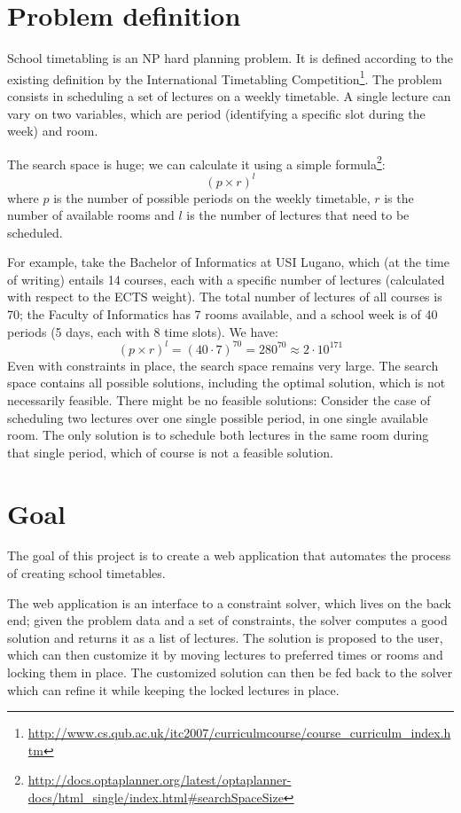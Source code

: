 \documentclass[12pt, a4paper, english]{report}
\begin{document}
\section{Problem definition}
School timetabling is an NP hard planning problem. It is defined according to the existing definition by the {International Timetabling Competition}\footnote{\url{http://www.cs.qub.ac.uk/itc2007/curriculmcourse/course\_curriculm\_index.htm}}. The problem consists in scheduling a set of lectures on a weekly timetable. A single lecture can vary on two variables, which are period (identifying a specific slot during the week) and room.\par
The search space is huge; we can calculate it using a simple formula\footnote{\url{http://docs.optaplanner.org/latest/optaplanner-docs/html\_single/index.html\#searchSpaceSize}}: %
\[
	(p \times r)^l
\]
where \(p\) is the number of possible periods on the weekly timetable, \(r\) is the number of available rooms and \(l\) is the number of lectures that need to be scheduled.\par
For example, take the Bachelor of Informatics at USI Lugano, which (at the time of writing) entails 14 courses, each with a specific number of lectures (calculated with respect to the ECTS weight). The total number of lectures of all courses is 70; the Faculty of Informatics has 7 rooms available, and a school week is of 40 periods (5 days, each with 8 time slots). We have:
\[
	(p \times r)^l = (40\cdot7)^{70} = 280^{70} \approx 2\cdot10^{171}
\]
Even with constraints in place, the search space remains very large. The search space contains all possible solutions, including the optimal solution, which is not necessarily feasible. There might be no feasible solutions: Consider the case of scheduling two lectures over one single possible period, in one single available room. The only solution is to schedule both lectures in the same room during that single period, which of course is not a feasible solution.

\section{Goal}
The goal of this project is to create a web application that automates the process of creating school timetables.\par
The web application is an interface to a constraint solver, which lives on the back end; given the problem data and a set of constraints, the solver computes a good solution and returns it as a list of lectures. The solution is proposed to the user, which can then customize it by moving lectures to preferred times or rooms and locking them in place. The customized solution can then be fed back to the solver which can refine it while keeping the locked lectures in place.
\end{document}
